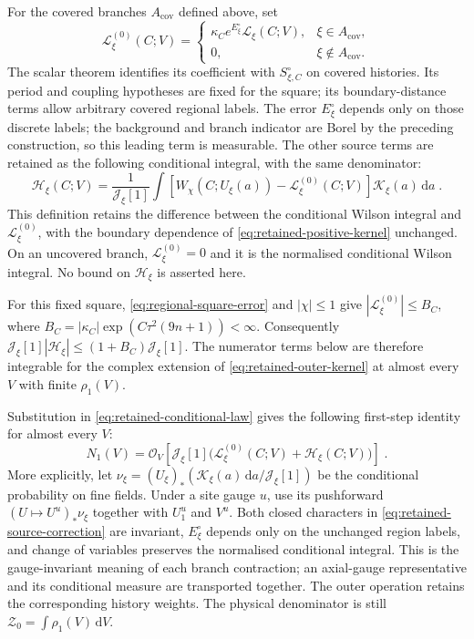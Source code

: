 \documentclass[11pt]{article}
\newcommand{\dd}{\mathrm{d}}
\begin{document}
For the covered branches $A_{\mathrm{cov}}$ defined above, set
\begin{equation}\label{eq:retained-leading-source}
    \mathcal L_\xi^{(0)}(C;V)=
    \begin{cases}
        \kappa_C e^{E^\circ_\xi}\mathcal L_\xi(C;V),
            &\xi\in A_{\mathrm{cov}},\\
        0,&\xi\notin A_{\mathrm{cov}}.
    \end{cases}
\end{equation}
The scalar theorem identifies its coefficient with $S^\circ_{\xi,C}$ on covered histories. Its period and coupling hypotheses are fixed for the square; its boundary-distance terms allow arbitrary covered regional labels. The error $E^\circ_\xi$ depends only on those discrete labels; the background and branch indicator are Borel by the preceding construction, so this leading term is measurable. The other source terms are retained as the following conditional integral, with the same denominator:
\begin{equation}\label{eq:retained-source-correction}
    \mathcal H_\xi(C;V)=
        \frac{1}{\mathcal J_\xi[1]}
        \int\left[W_\chi(C;U_\xi(a))-\mathcal L_\xi^{(0)}(C;V)\right]
            \mathcal K_\xi(a)\,\dd a\;.
\end{equation}
This definition retains the difference between the conditional Wilson integral and $\mathcal L_\xi^{(0)}$, with the boundary dependence of \eqref{eq:retained-positive-kernel} unchanged. On an uncovered branch, $\mathcal L_\xi^{(0)}=0$ and it is the normalised conditional Wilson integral. No bound on $\mathcal H_\xi$ is asserted here.

For this fixed square, \eqref{eq:regional-square-error} and $|\chi|\leq1$ give $|\mathcal L_\xi^{(0)}|\leq B_C$, where $B_C=|\kappa_C|\exp(C\tau^2(9n+1))<\infty$. Consequently $\mathcal J_\xi[1]|\mathcal H_\xi|\leq(1+B_C)\mathcal J_\xi[1]$. The numerator terms below are therefore integrable for the complex extension of \eqref{eq:retained-outer-kernel} at almost every $V$ with finite $\rho_1(V)$.

Substitution in \eqref{eq:retained-conditional-law} gives the following first-step identity for almost every $V$:
\begin{equation}\label{eq:retained-first-step-numerator}
    N_1(V)=\mathcal O_V\left[
        \mathcal J_\xi[1]
        \bigl(\mathcal L_\xi^{(0)}(C;V)+\mathcal H_\xi(C;V)\bigr)\right]\;.
\end{equation}
More explicitly, let $\nu_\xi=(U_\xi)_*(\mathcal K_\xi(a)\,\dd a/\mathcal J_\xi[1])$ be the conditional probability on fine fields. Under a site gauge $u$, use its pushforward $(U\mapsto U^u)_*\nu_\xi$ together with $U_1^u$ and $V^u$. Both closed characters in \eqref{eq:retained-source-correction} are invariant, $E^\circ_\xi$ depends only on the unchanged region labels, and change of variables preserves the normalised conditional integral. This is the gauge-invariant meaning of each branch contraction; an axial-gauge representative and its conditional measure are transported together. The outer operation retains the corresponding history weights. The physical denominator is still $\mathcal Z_0=\int\rho_1(V)\,\dd V$.
\end{document}

